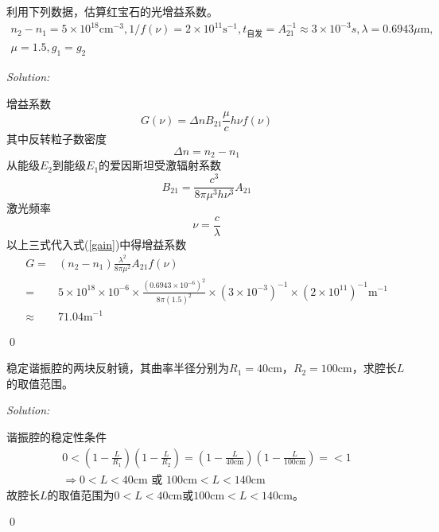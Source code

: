 \documentclass[12pt,a4paper]{article}
\newenvironment{problem}[2][Problem]{\begin{trivlist}
\item[\hskip \labelsep {\bfseries #1}\hskip \labelsep {\bfseries #2.}]}{\end{trivlist}}
\newenvironment{sol}
    {\emph{Solution:}
    }
    {
    \qed
    }
\begin{document}
\begin{problem}{2.1}
利用下列数据，估算红宝石的光增益系数。
\begin{gather*}
n_2-n_1=5\times10^{18}\text{cm}^{-3},1/f(\nu)=2\times10^{11}\text{s}^{-1},t_{\text{自发}}=A_{21}^{-1}\approx3\times10^{-3}s,\lambda=0.6943\mu\text{m},\\
\mu=1.5,g_1=g_2
\end{gather*}
\end{problem}
\begin{sol}
增益系数
\begin{equation}
\label{gain}
G(\nu)=\Delta nB_{21}\frac{\mu}{c}h\nu f(\nu)
\end{equation}
其中反转粒子数密度
\begin{equation}
\Delta n=n_2-n_1
\end{equation}
从能级$E_2$到能级$E_1$的爱因斯坦受激辐射系数
\begin{equation}
B_{21}=\frac{c^3}{8\pi\mu^3h\nu^3}A_{21}
\end{equation}
激光频率
\begin{equation}
\nu=\frac{c}{\lambda}
\end{equation}
以上三式代入式(\ref{gain})中得增益系数
\begin{align}
\nonumber G=&(n_2-n_1)\frac{\lambda^2}{8\pi\mu^2}A_{21}f(\nu)\\
\nonumber=&5\times10^{18}\times10^{-6}\times\frac{(0.6943\times10^{-6})^2}{8\pi(1.5)^2}\times(3\times10^{-3})^{-1}\times(2\times10^{11})^{-1}\text{m}^{-1}\\
\approx&71.04\text{m}^{-1}
\end{align}
\end{sol}

\begin{problem}{2.4}
稳定谐振腔的两块反射镜，其曲率半径分别为$R_1=40$cm，$R_2=100$cm，求腔长$L$的取值范围。
\end{problem}
\begin{sol}
谐振腔的稳定性条件
\begin{gather}
0<\left(1-\frac{L}{R_1}\right)\left(1-\frac{L}{R_2}\right)=\left(1-\frac{L}{40\text{cm}}\right)\left(1-\frac{L}{100\text{cm}}\right)=<1\\
\Longrightarrow0<L<40\text{cm 或 }100\text{cm}<L<140\text{cm}
\end{gather}
故腔长$L$的取值范围为$0<L<40\text{cm或}100\text{cm}<L<140\text{cm}$。
\end{sol}
\end{document}
